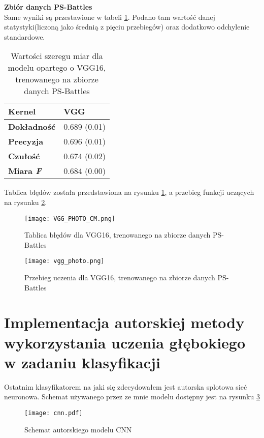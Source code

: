 \textbf{Zbiór danych PS-Battles} \\

Same wyniki są przestawione w tabeli \ref{tab:result_p_vgg}. Podano tam wartość danej statystyki(liczoną jako średnią z pięciu przebiegów) oraz dodatkowo odchylenie standardowe.
\begin{table}[h!]
	\centering
	\begin{tabular}{|l|l|}
		\hline
		\textbf{Kernel}     & VGG          \\ \hline
		\textbf{Dokładność} & 0.689 (0.01) \\ \hline
		\textbf{Precyzja}   & 0.696 (0.01) \\ \hline
		\textbf{Czułość}    & 0.674 (0.02) \\ \hline
		\textbf{Miara \textit{F}}    & 0.684 (0.00) \\ \hline
	\end{tabular}
	\caption{Wartości szeregu miar dla modelu opartego o VGG16, trenowanego na zbiorze danych PS-Battles}
	\label{tab:result_p_vgg}
\end{table}

Tablica błędów została przedstawiona na rysunku \ref{fig:vgg_cm_ps}, a przebieg funkcji uczących na rysunku \ref{fig:vgg_learn_photo}.

\begin{figure}[h!]
	\texttt{[image: VGG\_PHOTO\_CM.png]}
	\centering
	\caption{Tablica błędów dla VGG16, trenowanego na zbiorze danych PS-Battles}
	\label{fig:vgg_cm_ps}
\end{figure}
\begin{figure}[h!]
	\texttt{[image: vgg\_photo.png]}
	\centering
	\caption{Przebieg uczenia dla VGG16, trenowanego na zbiorze danych PS-Battles}
	\label{fig:vgg_learn_photo}
\end{figure}

\section{Implementacja autorskiej metody wykorzystania uczenia głębokiego w zadaniu klasyfikacji}

Ostatnim klasyfikatorem na jaki się zdecydowałem jest autorska splotowa sieć neuronowa. Schemat używanego przez ze mnie modelu dostępny jest na rysunku \ref{fig:cnn}

\begin{figure}[h!]
	\texttt{[image: cnn.pdf]}
	\centering
	\caption{Schemat autorskiego modelu CNN}
	\label{fig:cnn}
\end{figure}

